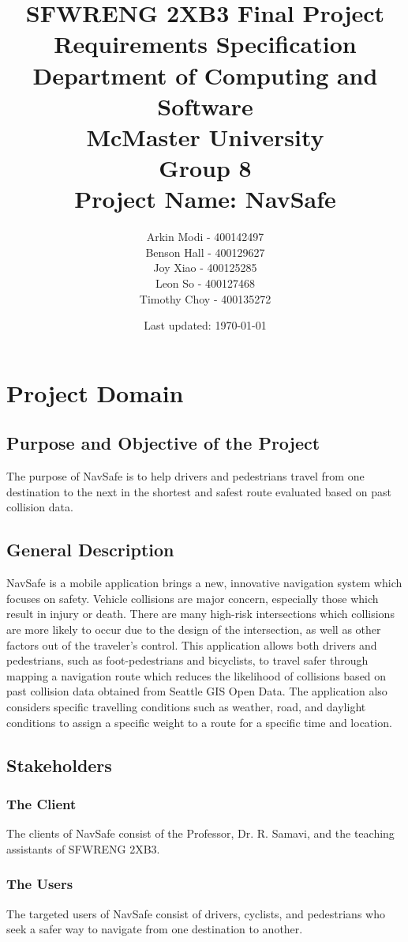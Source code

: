 \documentclass[12pt]{article}
\title{SFWRENG 2XB3 Final Project\\
        \large Requirements Specification\\
        \vspace{1ex}
        \large Department of Computing and Software\\
        \large McMaster University\\
        \vspace{1ex}
        \large Group 8\\
        \large Project Name: NavSafe}
\author{Arkin Modi - 400142497\\
        Benson Hall - 400129627\\
        Joy Xiao - 400125285\\
        Leon So - 400127468\\
        Timothy Choy - 400135272}
\date{Last updated: \today}
\begin{document}
\maketitle
\newpage
\tableofcontents
\newpage

\section{Project Domain}
\subsection{Purpose and Objective of the Project}
The purpose of NavSafe is to help drivers and pedestrians travel from one destination to the next in the shortest and safest route evaluated based on past collision data. 

\subsection{General Description}
NavSafe is a mobile application brings a new, innovative navigation system which focuses on safety. Vehicle collisions are major concern, especially those which result in injury or death. There are many high-risk intersections which collisions are more likely to occur due to the design of the intersection, as well as other factors out of the traveler’s control. This application allows both drivers and pedestrians, such as foot-pedestrians and bicyclists, to travel safer through mapping a navigation route which reduces the likelihood of collisions based on past collision data obtained from Seattle GIS Open Data. The application also considers specific travelling conditions such as weather, road, and daylight conditions to assign a specific weight to a route for a specific time and location.

\subsection{Stakeholders}

    \subsubsection{The Client}
    The clients of NavSafe consist of the Professor, Dr. R. Samavi, and the teaching assistants of SFWRENG 2XB3.
    
    \subsubsection{The Users}
    The targeted users of NavSafe consist of drivers, cyclists, and pedestrians who seek a safer way to navigate from one destination to another.
    
\end{document}
